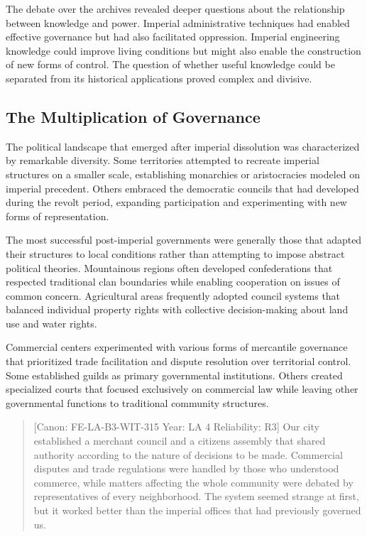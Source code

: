 The debate over the archives revealed deeper questions about the
relationship between knowledge and power. Imperial administrative
techniques had enabled effective governance but had also facilitated
oppression. Imperial engineering knowledge could improve living
conditions but might also enable the construction of new forms of
control. The question of whether useful knowledge could be separated
from its historical applications proved complex and divisive.

\subsection{The Multiplication of
Governance}\label{the-multiplication-of-governance}

The political landscape that emerged after imperial dissolution was
characterized by remarkable diversity. Some territories attempted to
recreate imperial structures on a smaller scale, establishing monarchies
or aristocracies modeled on imperial precedent. Others embraced the
democratic councils that had developed during the revolt period,
expanding participation and experimenting with new forms of
representation.

The most successful post-imperial governments were generally those that
adapted their structures to local conditions rather than attempting to
impose abstract political theories. Mountainous regions often developed
confederations that respected traditional clan boundaries while enabling
cooperation on issues of common concern. Agricultural areas frequently
adopted council systems that balanced individual property rights with
collective decision-making about land use and water rights.

Commercial centers experimented with various forms of mercantile
governance that prioritized trade facilitation and dispute resolution
over territorial control. Some established guilds as primary
governmental institutions. Others created specialized courts that
focused exclusively on commercial law while leaving other governmental
functions to traditional community structures.

\begin{quote}
{[}Canon: FE-LA-B3-WIT-315 \textbar{} Year: LA 4 \textbar{} Reliability:
R3{]} Our city established a merchant council and a
citizens\textquotesingle{} assembly that shared authority according to
the nature of decisions to be made. Commercial disputes and trade
regulations were handled by those who understood commerce, while matters
affecting the whole community were debated by representatives of every
neighborhood. The system seemed strange at first, but it worked better
than the imperial offices that had previously governed us.
\end{quote}


